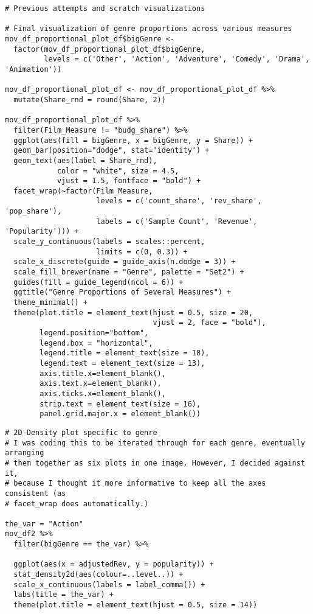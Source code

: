 \begin{lstlisting}
# Previous attempts and scratch visualizations

# Final visualization of genre proportions across various measures
mov_df_proportional_plot_df$bigGenre <-
  factor(mov_df_proportional_plot_df$bigGenre,
         levels = c('Other', 'Action', 'Adventure', 'Comedy', 'Drama', 'Animation'))

mov_df_proportional_plot_df <- mov_df_proportional_plot_df %>%
  mutate(Share_rnd = round(Share, 2))

mov_df_proportional_plot_df %>%
  filter(Film_Measure != "budg_share") %>%
  ggplot(aes(fill = bigGenre, x = bigGenre, y = Share)) +
  geom_bar(position="dodge", stat='identity') +
  geom_text(aes(label = Share_rnd),
            color = "white", size = 4.5,
            vjust = 1.5, fontface = "bold") +
  facet_wrap(~factor(Film_Measure,
                     levels = c('count_share', 'rev_share', 'pop_share'),
                     labels = c('Sample Count', 'Revenue', 'Popularity'))) +
  scale_y_continuous(labels = scales::percent,
                     limits = c(0, 0.3)) +
  scale_x_discrete(guide = guide_axis(n.dodge = 3)) + 
  scale_fill_brewer(name = "Genre", palette = "Set2") +
  guides(fill = guide_legend(ncol = 6)) +
  ggtitle("Genre Proportions of Several Measures") +
  theme_minimal() +
  theme(plot.title = element_text(hjust = 0.5, size = 20, 
                                  vjust = 2, face = "bold"),
        legend.position="bottom",
        legend.box = "horizontal",
        legend.title = element_text(size = 18),
        legend.text = element_text(size = 13),
        axis.title.x=element_blank(),
        axis.text.x=element_blank(),
        axis.ticks.x=element_blank(),
        strip.text = element_text(size = 16),
        panel.grid.major.x = element_blank())
\end{lstlisting}

\begin{lstlisting}
# 2D-Density plot specific to genre
# I was coding this to be iterated through for each genre, eventually arranging
# them together as six plots in one image. However, I decided against it,
# because I thought it more informative to keep all the axes consistent (as 
# facet_wrap does automatically.) 

the_var = "Action"
mov_df2 %>%
  filter(bigGenre == the_var) %>%
  
  ggplot(aes(x = adjustedRev, y = popularity)) +
  stat_density2d(aes(colour=..level..)) +
  scale_x_continuous(labels = label_comma()) +
  labs(title = the_var) +
  theme(plot.title = element_text(hjust = 0.5, size = 14))
\end{lstlisting}

